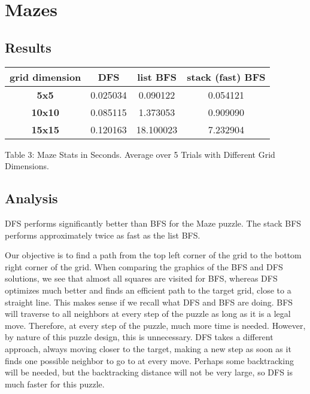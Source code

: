 \documentclass[12pt]{article}
\begin{document}
\section{Mazes}

\subsection{Results}

\begin{center}
\begin{tabular}{ |c|c|c|c| } 
\hline
\textbf{grid dimension} & \textbf{DFS} & \textbf{list BFS} & \textbf{stack (fast) BFS} \\
\hline
\textbf{5x5} & 0.025034 & 0.090122 & 0.054121 \\
\textbf{10x10} & 0.085115 & 1.373053 & 0.909090 \\ 
\textbf{15x15} & 0.120163 & 18.100023 & 7.232904 \\ 
\hline
\end{tabular}
\end{center}
Table 3: Maze Stats in Seconds. Average over 5 Trials with Different Grid Dimensions.


\subsection{Analysis}
\noindent

DFS performs significantly better than BFS for the Maze puzzle. The stack BFS performs approximately twice as fast as the list BFS.

Our objective is to find a path from the top left corner of the grid to the bottom right corner of the grid. When comparing the graphics of the BFS and DFS solutions, we see that almost all squares are visited for BFS, whereas DFS optimizes much better and finds an efficient path to the target grid, close to a straight line. This makes sense if we recall what DFS and BFS are doing. BFS will traverse to all neighbors at every step of the puzzle as long as it is a legal move. Therefore, at every step of the puzzle, much more time is needed. However, by nature of this puzzle design, this is unnecessary. DFS takes a different approach, always moving closer to the target, making a new step as soon as it finds one possible neighbor to go to at every move. Perhaps some backtracking will be needed, but the backtracking distance will not be very large, so DFS is much faster for this puzzle.
\end{document}
